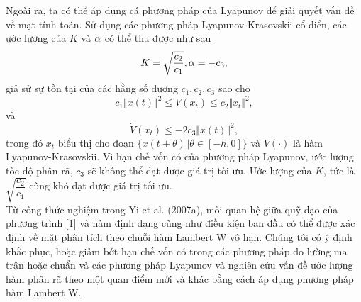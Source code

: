 %
Ngoài ra, ta có thể áp dụng cá phương pháp của Lyapunov để giải
quyết vấn đề về mặt tính toán. Sử dụng các phương pháp Lyapunov-Krasovskii cổ điển, các ước lượng của $K$ và $\alpha$ có thể thu được như sau
%
\begin{equation}\label{5}
	K = \sqrt{\dfrac{c_2}{c_1}}, \alpha = - c_3,
\end{equation}
%
giả sử sự tồn tại của các hằng số dương $c_1, c_2, c_3$ sao cho\\
%
\begin{equation}\label{6}
	c_1 \Vert x(t) \Vert ^2 \le V(x_t) \le c_2 \Vert x_t \Vert ^2,
\end{equation}
%
và
%
\begin{equation}\label{7}
	\dot{V}(x_t) \le -2c_3 \Vert x(t) \Vert ^2,
\end{equation}
%
trong đó $x_t$ biểu thị cho đoạn $\{x(t+ \theta) \Vert \theta \in [-h, 0]\}$ và $V(\cdot)$ là hàm Lyapunov-Krasovskii. Vì hạn chế vốn có của phương pháp Lyapunov, ước lượng tốc độ phân rã, $c_3$ sẽ không thể đạt được giá trị tối ưu. Ước lượng của $K$, tức là $\sqrt{\dfrac{c_2}{c_1}}$ cũng khó đạt được giá trị tối ưu.\\
%
Từ công thức nghiệm trong Yi et al. (2007a), mối quan hệ giữa quỹ đạo của phương trình \eqref{1} và hàm định dạng cũng như điều kiện ban đầu có thể được xác định về mặt phân tích theo chuỗi hàm Lambert W vô hạn. 
Chúng tôi có ý định khắc phục, hoặc giảm bớt hạn chế vốn có trong các phương pháp đo lường ma trận hoặc chuẩn và các phương pháp Lyapunov và nghiên cứu vấn đề ước lượng hàm phân rã theo một quan điểm mới và khác bằng cách áp dụng phương pháp hàm Lambert W.

